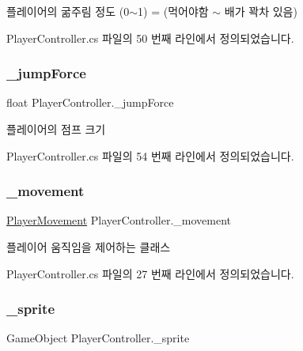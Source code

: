 플레이어의 굶주림 정도 (0$\sim$1) = (먹어야함 $\sim$ 배가 꽉차 있음) 



Player\+Controller.\+cs 파일의 50 번째 라인에서 정의되었습니다.

\mbox{\label{class_player_controller_aaec5e4333fe1c532900ca666c075261c}} 
\subsubsection{\texorpdfstring{\_jumpForce}{\_jumpForce}}
{\footnotesize\ttfamily float Player\+Controller.\+\_\+jump\+Force\hspace{0.3cm}{\ttfamily [private]}}



플레이어의 점프 크기 



Player\+Controller.\+cs 파일의 54 번째 라인에서 정의되었습니다.

\mbox{\label{class_player_controller_ad788cfe2e37318d22d52010dc0fecd57}} 
\subsubsection{\texorpdfstring{\_movement}{\_movement}}
{\footnotesize\ttfamily \mbox{\hyperlink{class_player_movement}{Player\+Movement}} Player\+Controller.\+\_\+movement\hspace{0.3cm}{\ttfamily [private]}}



플레이어 움직임을 제어하는 클래스 



Player\+Controller.\+cs 파일의 27 번째 라인에서 정의되었습니다.

\mbox{\label{class_player_controller_aeb0b2dc2ef34062f72afaf20899ce307}} 
\subsubsection{\texorpdfstring{\_sprite}{\_sprite}}
{\footnotesize\ttfamily Game\+Object Player\+Controller.\+\_\+sprite\hspace{0.3cm}{\ttfamily [private]}}



